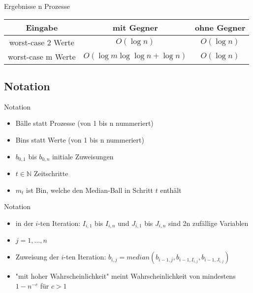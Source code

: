 \documentclass{beamer}
\begin{document}
    \begin{frame}{Ergebnisse}
        n Prozesse
        \vfill
        \begin{tabular}{c|c|c}
            Eingabe & mit Gegner & ohne Gegner\\
            \hline
            worst-case 2 Werte & \(O(\log n)\) & \(O(\log n)\) \\
            \hline
            worst-case m Werte & \(O(\log m \log \log n + \log n)\) & \(O(\log n)\)
        \end{tabular}
    \end{frame}

    \subsection{Notation}
    \begin{frame}{Notation}
        \begin{itemize}
            \item Bälle statt Prozesse (von 1 bis n nummeriert)
            \vfill
            \item Bins statt Werte (von 1 bis n nummeriert)
            \vfill
            \item \(b_{0,1}\) bis \(b_{0,n}\) initiale Zuweisungen
            \vfill
            \item \(t \in \mathbb{N}\) Zeitschritte
            \vfill
            \item \(m_t\) ist Bin, welche den Median-Ball in Schritt
                  \(t\) enthält
        \end{itemize}
    \end{frame}

    \begin{frame}{Notation}
        \begin{itemize}
            \item in der \(i\)-ten Iteration: \(I_{i,1}\) bis \(I_{i,n}\) und
                  \(J_{i,1}\) bis \(J_{i,n}\) sind 2n zufällige Variablen
            \vfill
            \item \(j = 1,...,n\)
            \vfill
            \item Zuweisung der \(i\)-ten Iteration:
                  \(b_{i,j} = median(b_{i-1,j}, b_{i-1,I_{i,j}}, b_{i-1,J_{i,j}})\)
            \vfill
            \item "mit hoher Wahrscheinlichkeit" meint Wahrscheinlichkeit von
                  mindestens \(1 - n^{-c}\) für \(c > 1\)
        \end{itemize}
    \end{frame}
\end{document}
